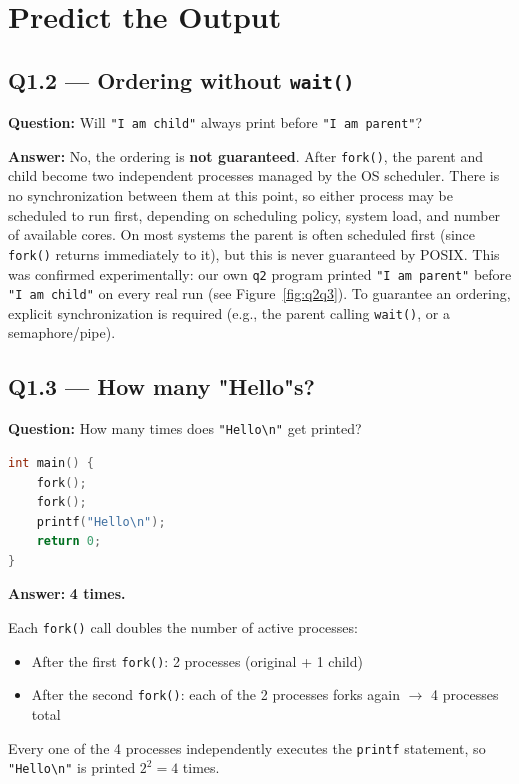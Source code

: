 \section{Predict the Output}

\subsection*{Q1.2 --- Ordering without \texttt{wait()}}

\textbf{Question:} Will \texttt{"I am child"} always print before \texttt{"I am parent"}?

\textbf{Answer:} No, the ordering is \textbf{not guaranteed}. After \texttt{fork()}, the parent
and child become two independent processes managed by the OS scheduler. There is no
synchronization between them at this point, so either process may be scheduled to run
first, depending on scheduling policy, system load, and number of available cores.
On most systems the parent is often scheduled first (since \texttt{fork()} returns
immediately to it), but this is never guaranteed by POSIX. This was confirmed
experimentally: our own \texttt{q2} program printed \texttt{"I am parent"} before
\texttt{"I am child"} on every real run (see Figure~\ref{fig:q2q3}). To guarantee an
ordering, explicit synchronization is required (e.g., the parent calling \texttt{wait()},
or a semaphore/pipe).

\subsection*{Q1.3 --- How many "Hello"s?}

\textbf{Question:} How many times does \texttt{"Hello\textbackslash n"} get printed?

\begin{lstlisting}[language=C]
int main() {
    fork();
    fork();
    printf("Hello\n");
    return 0;
}
\end{lstlisting}

\textbf{Answer:} \textbf{4 times.}

Each \texttt{fork()} call doubles the number of active processes:
\begin{itemize}
    \item After the first \texttt{fork()}: 2 processes (original + 1 child)
    \item After the second \texttt{fork()}: each of the 2 processes forks again $\rightarrow$ 4 processes total
\end{itemize}
Every one of the 4 processes independently executes the \texttt{printf} statement, so
\texttt{"Hello\textbackslash n"} is printed $2^2 = 4$ times.

